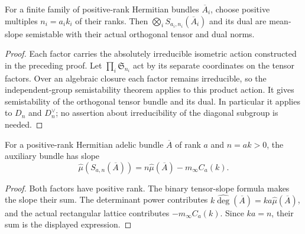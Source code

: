 \begin{lemma}
\label{lem:determinant-specht-product-semistability}
\leanok
For a finite family of positive-rank Hermitian bundles $\overline A_i$,
choose positive multiples $n_i=a_i k_i$ of their ranks. Then
$\bigotimes_i S_{a_i,n_i}(\overline A_i)$ and its dual are mean-slope
semistable with their actual orthogonal tensor and dual norms.
\end{lemma}
\begin{proof}
Each factor carries the absolutely irreducible isometric action constructed
in the preceding proof. Let $\prod_i\mathfrak S_{n_i}$ act by its separate
coordinates on the tensor factors. Over an algebraic closure each factor
remains irreducible, so the independent-group semistability theorem applies
to this product action. It gives semistability of the orthogonal tensor
bundle and its dual. In particular it applies to $D_n$ and $D_n^{\vee}$;
no assertion about irreducibility of the diagonal subgroup is needed.
\end{proof}

\begin{lemma}
\label{lem:determinant-specht-slope}
\leanok
For a positive-rank Hermitian adelic bundle $\overline A$ of rank $a$ and
$n=ak>0$, the auxiliary bundle has slope
\[
 \widehat\mu(S_{a,n}(\overline A))
   =n\widehat\mu(\overline A)-m_\infty C_a(k).
\]
\end{lemma}
\begin{proof}
Both factors have positive rank. The binary tensor-slope formula makes
the slope their sum. The determinant power contributes
$k\widehat{\deg}(\overline A)=ka\widehat\mu(\overline A)$,
and the actual rectangular lattice contributes $-m_\infty C_a(k)$.
Since $ka=n$, their sum is the displayed expression.
\end{proof}

